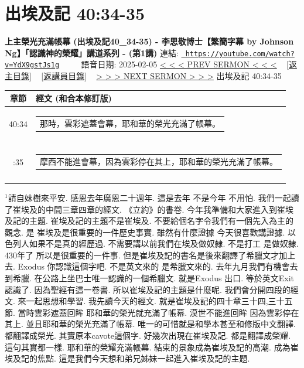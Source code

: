 \documentclass{book}
\begin{document}
\section{出埃及記 40:34-35}
\label{sec:YdX9gstJs1g}
\textbf{上主榮光充滿帳幕 (出埃及記40\_34-35) - 李思敬博士【繁簡字幕 by Johnson Ng】「認識神的榮耀」講道系列 - (第1講)}
\newline
\newline
連結: \href{https://youtube.com/watch?v=YdX9gstJs1g}{\texttt{ https://youtube.com/watch?v=YdX9gstJs1g}} ~~~~ 語音日期: 2025-02-05 
\newline
\newline
\hyperref[sec:cau3XNPSx68]{< < < PREV SERMON < < <}
~
\hyperlink{toc}{[返主目錄]}
~
\hyperref[ch:preacher2]{[返講員目錄]}
~
\hyperref[sec:l8BFPdIOADs]{> > > NEXT SERMON > > >}
\newline
\newline
出埃及記 40:34-35
\newline
\begin{longtable}{cl}
\hline
\hline
章節 & 經文 (和合本修訂版)\\
\hline
40:34 & \begin{tabularx}{0.7\textwidth}{X} 那時，雲彩遮蓋會幕，耶和華的榮光充滿了帳幕。 \end{tabularx} \\ \\ \relax
40:35 & \begin{tabularx}{0.7\textwidth}{X} 摩西不能進會幕，因為雲彩停在其上，耶和華的榮光充滿了帳幕。 \end{tabularx} \\ \\
[1ex]
\hline
\hline
\end{longtable}
$^{1}$請自妹樹來平安.
感恩去年廣恩二十週年.
這是去年 不是今年 不用怕.
我們一起讀了崔埃及的中間三章四章的經文.
《立約》的書卷.
今年我準備和大家進入到崔埃及記的主題.
崔埃及記的主題不是崔埃及.
不要給個名字令我們有一個先入為主的觀念.
是 崔埃及是很重要的一件歷史事實.
雖然有什麼證據 今天很喜歡講證據.
以色列人如果不是真的經歷過.
不需要講以前我們在埃及做奴隸.
不是打工 是做奴隸.
430年了 所以是很重要的一件事.
但是崔埃及記的書名是後來翻譯了希臘文才加上去.
Exodus 你認識這個字吧.
不是英文來的 是希臘文來的.
去年九月我們有機會去到希臘.
在公路上坐巴士唯一認識的一個希臘文.
就是Exodus 出口.
等於英文Exit 認識了.
因為聖經有這一卷書.
所以崔埃及記的主題是什麼呢.
我們會分開四段的經文.
來一起思想和學習.
我先讀今天的經文.
就是崔埃及記的四十章三十四,三十五節.
當時雲彩遮蓋回眸 耶和華的榮光就充滿了帳幕.
漠世不能進回眸 因為雲彩停在其上.
並且耶和華的榮光充滿了帳幕.
唯一的可惜就是和學本甚至和修版中文翻譯.
都翻譯成榮光.
其實原本cavote這個字.
好幾次出現在崔埃及記.
都是翻譯成榮耀.
這句其實都一樣.
耶和華的榮耀充滿帳幕.
結束的景象成為崔埃及記的高潮.
成為崔埃及記的焦點.
這是我們今天想和弟兄姊妹一起進入崔埃及記的主題.
\end{document}
